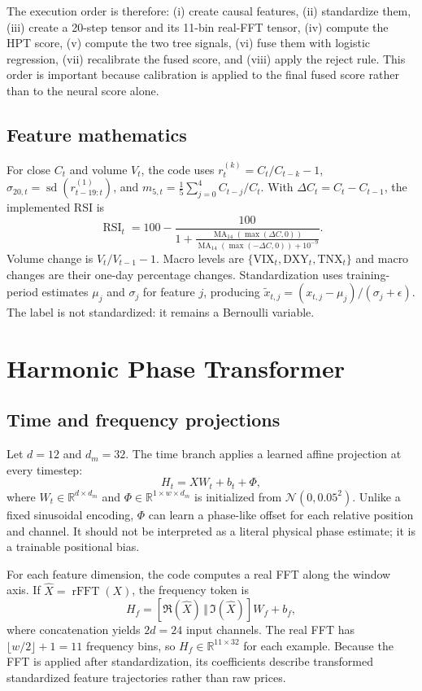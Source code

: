 \documentclass[11pt]{article}
\newcommand{\R}{\mathbb{R}}
\begin{document}
The execution order is therefore: (i) create causal features, (ii) standardize them, (iii) create a 20-step tensor and its 11-bin real-FFT tensor, (iv) compute the HPT score, (v) compute the two tree signals, (vi) fuse them with logistic regression, (vii) recalibrate the fused score, and (viii) apply the reject rule. This order is important because calibration is applied to the final fused score rather than to the neural score alone.

\subsection{Feature mathematics}
For close $C_t$ and volume $V_t$, the code uses $r^{(k)}_t=C_t/C_{t-k}-1$, $\sigma_{20,t}=\operatorname{sd}(r^{(1)}_{t-19:t})$, and $m_{5,t}=\frac{1}{5}\sum_{j=0}^{4}C_{t-j}/C_t$. With $\Delta C_t=C_t-C_{t-1}$, the implemented RSI is
\begin{equation}
 \operatorname{RSI}_t=100-\frac{100}{1+\frac{\operatorname{MA}_{14}(\max(\Delta C,0))}{\operatorname{MA}_{14}(\max(-\Delta C,0))+10^{-9}}}.
\end{equation}
Volume change is $V_t/V_{t-1}-1$. Macro levels are $\{\mathrm{VIX}_t,\mathrm{DXY}_t,\mathrm{TNX}_t\}$ and macro changes are their one-day percentage changes. Standardization uses training-period estimates $\mu_j$ and $\sigma_j$ for feature $j$, producing $\tilde x_{t,j}=(x_{t,j}-\mu_j)/(\sigma_j+\epsilon)$. The label is not standardized: it remains a Bernoulli variable.

\section{Harmonic Phase Transformer}
\subsection{Time and frequency projections}
Let $d=12$ and $d_m=32$. The time branch applies a learned affine projection at every timestep:
\begin{equation}
 H_t=XW_t+b_t+\Phi,
\end{equation}
where $W_t\in\R^{d\times d_m}$ and $\Phi\in\R^{1\times w\times d_m}$ is initialized from $\mathcal N(0,0.05^2)$. Unlike a fixed sinusoidal encoding, $\Phi$ can learn a phase-like offset for each relative position and channel. It should not be interpreted as a literal physical phase estimate; it is a trainable positional bias.

For each feature dimension, the code computes a real FFT along the window axis. If $\widehat X=\operatorname{rFFT}(X)$, the frequency token is
\begin{equation}
 H_f=[\Re(\widehat X)\,\Vert\,\Im(\widehat X)]W_f+b_f,
\end{equation}
where concatenation yields $2d=24$ input channels. The real FFT has $\lfloor w/2\rfloor+1=11$ frequency bins, so $H_f\in\R^{11\times32}$ for each example. Because the FFT is applied after standardization, its coefficients describe transformed standardized feature trajectories rather than raw prices.
\end{document}
